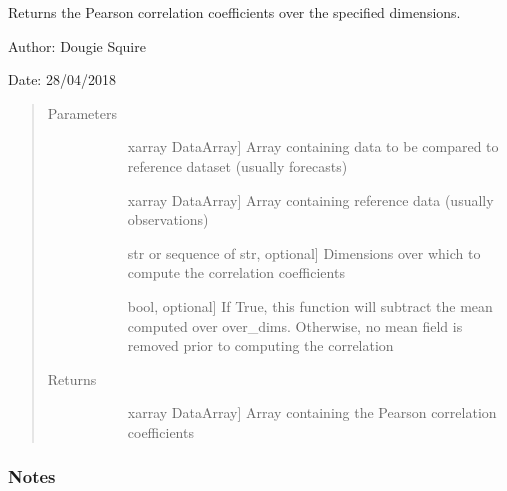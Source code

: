 \documentclass[letterpaper,10pt,english]{sphinxmanual}
\begin{document}
\begin{fulllineitems}
\label{\detokenize{skill_doc:skill.Pearson_corrcoeff}}
Returns the Pearson correlation coefficients over the specified dimensions.

\begin{DUlineblock}{0em}
\item[] Author: Dougie Squire
\item[] Date: 28/04/2018
\end{DUlineblock}
\begin{quote}\begin{description}
\item[{Parameters}] \leavevmode\begin{description}
\item[{}] \leavevmode{[}xarray DataArray{]}
Array containing data to be compared to reference dataset (usually forecasts)

\item[{}] \leavevmode{[}xarray DataArray{]}
Array containing reference data (usually observations)

\item[{}] \leavevmode{[}str or sequence of str, optional{]}
Dimensions over which to compute the correlation coefficients

\item[{}] \leavevmode{[}bool, optional{]}
If True, this function will subtract the mean computed over over\_dims. Otherwise, no mean                    field is removed prior to computing the correlation

\end{description}

\item[{Returns}] \leavevmode\begin{description}
\item[{}] \leavevmode{[}xarray DataArray{]}
Array containing the Pearson correlation coefficients

\end{description}

\end{description}\end{quote}
\subsubsection*{Notes}


\end{fulllineitems}
\end{document}
